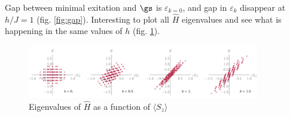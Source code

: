 Gap between minimal exitation and $\gs$ is $\varepsilon_{k=0}$,
 and gap in $\varepsilon_k$ disappear at $h/J=1$ (fig. \ref{fig:gap}). Interesting to plot all $\hat{H}$ eigenvalues and see what is happening in the same values of $h$ (fig. \ref{fig:F}). 




\begin{figure}[h]
    \centering
    \includegraphics[width=0.9\textwidth]{imgs/3F.pdf}
    \caption{Eigenvalues of $\hat{H}$ as a function of $\langle S_z\rangle$}
    \label{fig:F}
\end{figure}
